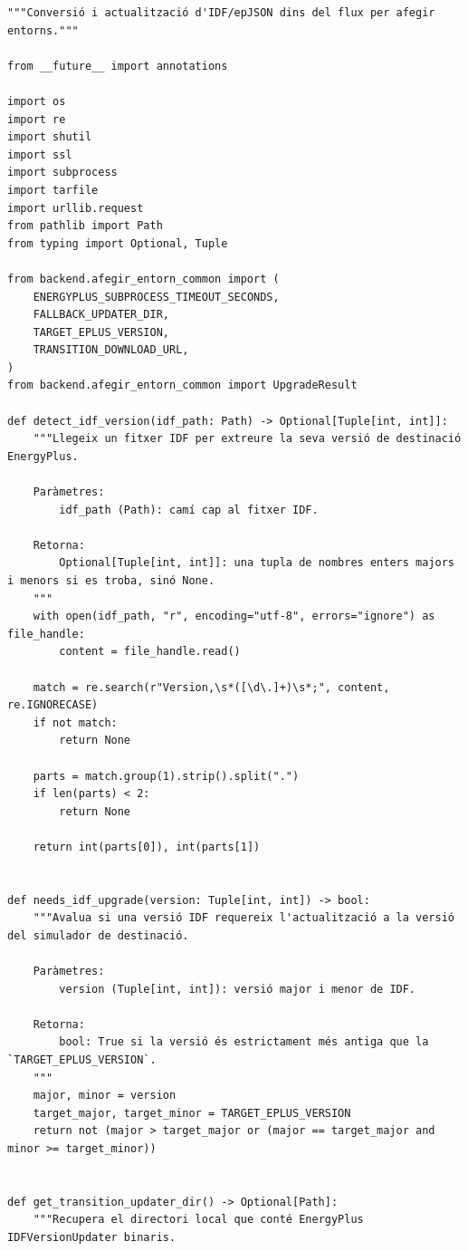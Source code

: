 \documentclass[10pt,a4paper]{article}
\begin{document}
\begin{lstlisting}[style=studioPython,caption={backend/afegir\_entorn\_conversion.py},label={lst:backend-afegir-entorn-conversion-py}]
"""Conversió i actualització d'IDF/epJSON dins del flux per afegir entorns."""

from __future__ import annotations

import os
import re
import shutil
import ssl
import subprocess
import tarfile
import urllib.request
from pathlib import Path
from typing import Optional, Tuple

from backend.afegir_entorn_common import (
    ENERGYPLUS_SUBPROCESS_TIMEOUT_SECONDS,
    FALLBACK_UPDATER_DIR,
    TARGET_EPLUS_VERSION,
    TRANSITION_DOWNLOAD_URL,
)
from backend.afegir_entorn_common import UpgradeResult

def detect_idf_version(idf_path: Path) -> Optional[Tuple[int, int]]:
    """Llegeix un fitxer IDF per extreure la seva versió de destinació EnergyPlus.

    Paràmetres:
        idf_path (Path): camí cap al fitxer IDF.

    Retorna:
        Optional[Tuple[int, int]]: una tupla de nombres enters majors i menors si es troba, sinó None.
    """
    with open(idf_path, "r", encoding="utf-8", errors="ignore") as file_handle:
        content = file_handle.read()

    match = re.search(r"Version,\s*([\d\.]+)\s*;", content, re.IGNORECASE)
    if not match:
        return None

    parts = match.group(1).strip().split(".")
    if len(parts) < 2:
        return None

    return int(parts[0]), int(parts[1])


def needs_idf_upgrade(version: Tuple[int, int]) -> bool:
    """Avalua si una versió IDF requereix l'actualització a la versió del simulador de destinació.

    Paràmetres:
        version (Tuple[int, int]): versió major i menor de IDF.

    Retorna:
        bool: True si la versió és estrictament més antiga que la `TARGET_EPLUS_VERSION`.
    """
    major, minor = version
    target_major, target_minor = TARGET_EPLUS_VERSION
    return not (major > target_major or (major == target_major and minor >= target_minor))


def get_transition_updater_dir() -> Optional[Path]:
    """Recupera el directori local que conté EnergyPlus IDFVersionUpdater binaris.


\end{lstlisting}
\end{document}

